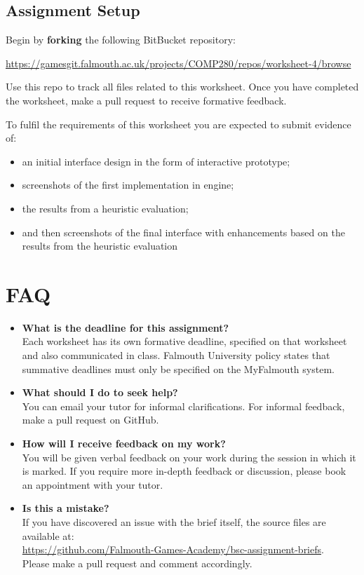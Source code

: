 \documentclass{../../fal_assignment}
\begin{document}
\subsection*{Assignment Setup} 

Begin by \textbf{forking} the following BitBucket repository: 

\hyperlink{https://gamesgit.falmouth.ac.uk/projects/COMP280/repos/worksheet-4/browse}{https://gamesgit.falmouth.ac.uk/projects/COMP280/repos/worksheet-4/browse} 

Use this repo to track all files related to this worksheet. Once you have completed the worksheet, make a pull request to receive formative feedback. 

To fulfil the requirements of this worksheet you are expected to submit evidence of:

\begin{itemize}
	\item an initial interface design in the form of interactive prototype;
	\item screenshots of the first implementation in engine;
	\item the results from a heuristic evaluation;
	\item and then screenshots of the final interface with enhancements based on the results from the heuristic evaluation
\end{itemize}


\section*{FAQ}

\begin{itemize}
	\item 	\textbf{What is the deadline for this assignment?} \\ 
			Each worksheet has its own formative deadline, specified on that worksheet and also communicated in class.
    		Falmouth University policy states that summative deadlines must only be specified on the MyFalmouth system.
    		
	\item 	\textbf{What should I do to seek help?} \\ 
    		You can email your tutor for informal clarifications. For informal feedback, make a pull request on GitHub. 
    		
	\item 	\textbf{How will I receive feedback on my work?} \\ 
    		You will be given verbal feedback on your work during the session in which it is marked.
    		If you require more in-depth feedback or discussion, please book an appointment with your tutor.
    		
    	\item 	\textbf{Is this a mistake?} \\ 	
    		If you have discovered an issue with the brief itself, the source files are available at: \\
    		\url{https://github.com/Falmouth-Games-Academy/bsc-assignment-briefs}.\\
    		 Please make a pull request and comment accordingly.
\end{itemize}
\end{document}
